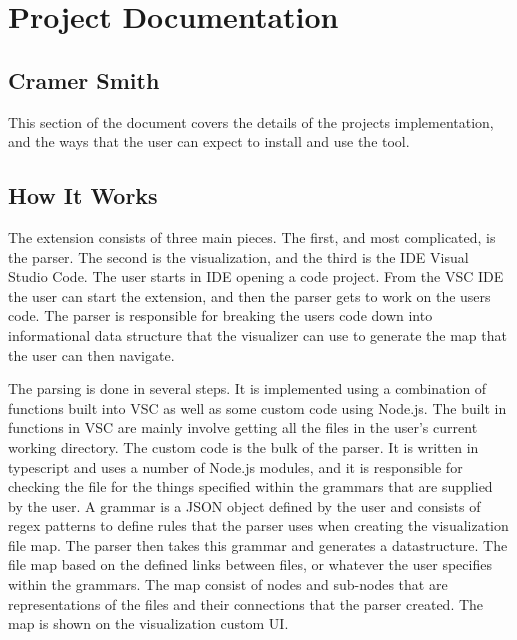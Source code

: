 \documentclass[letterpaper,10pt,titlepage,draftclsnofoot,onecolumn,onesided] {IEEEtran}
\begin{document}
\section{Project Documentation}
\subsection*{Cramer Smith}
This section of the document covers the details of the projects implementation, and the ways that the user can expect to install and use the tool.

\subsection{How It Works}
The extension consists of three main pieces. The first, and most complicated, is the parser. 
The second is the visualization, and the third is the IDE Visual Studio Code.
The user starts in IDE opening a code project. 
From the VSC IDE the user can start the extension, and then the parser gets to work on the users code. 
The parser is responsible for breaking the users code down into informational data structure that the visualizer can use to generate the map that the user can then navigate. 

The parsing is done in several steps. 
It is implemented using a combination of functions built into VSC as well as some custom code using Node.js. 
The built in functions in VSC are mainly involve getting all the files in the user's current working directory. 
The custom code is the bulk of the parser.
It is written in typescript and uses a number of Node.js modules, and it is responsible for checking the file for the things specified within the grammars that are supplied by the user. 
A grammar is a JSON object defined by the user and consists of regex patterns to define  rules that the parser uses when creating the visualization file map. 
The parser then takes this grammar and generates a datastructure. 
The file map based on the defined links between files, or whatever the user specifies within the grammars.
The map consist of nodes and sub-nodes that are representations of the files and their connections that the parser created.
The map is shown on the visualization custom UI. \\
\end{document}
